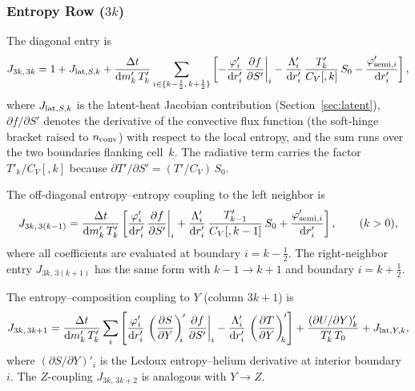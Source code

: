 \documentclass{aastex631}
\newcommand{\dd}{\mathrm{d}}
\newcommand{\pp}{\partial}
\newcommand{\Cv}{C_V}
\begin{document}
\subsubsection{Entropy Row ($3k$)}\label{sec:jac_entropy}

The diagonal entry is
\begin{equation}\label{eq:J_SS_diag}
  J_{3k,\,3k}
  = 1 + J_{{\rm lat},S,k}
  + \frac{\Delta t}{\dd m'_k\,T'_k}
    \sum_{i\in\{k-\frac{1}{2},\,k+\frac{1}{2}\}}
    \left[
      -\frac{\varphi'_i}{\dd r'_i}\,
       \frac{\pp f}{\pp S'}\bigg|_i
      -\frac{\Lambda'_i}{\dd r'_i}\,
       \frac{T'_k}{\Cv[,k]}\,S_0
      -\frac{\varphi'_{{\rm semi},i}}{\dd r'_i}
    \right],
\end{equation}
where $J_{{\rm lat},S,k}$ is the latent-heat Jacobian contribution
(Section~\ref{sec:latent}), $\pp f/\pp S'$ denotes the derivative
of the convective flux function (the soft-hinge bracket raised to
$n_{\rm conv}$) with respect to the local entropy, and the sum runs
over the two boundaries flanking cell~$k$.  The radiative term
carries the factor $T'_k/\Cv[,k]$ because $\pp T'/\pp S' = (T'/\Cv)\,S_0$.

The off-diagonal entropy--entropy coupling to the left neighbor is
\begin{equation}\label{eq:J_SS_km1}
  J_{3k,\,3(k-1)}
  = \frac{\Delta t}{\dd m'_k\,T'_k}
    \left[
      \frac{\varphi'_i}{\dd r'_i}\,
       \frac{\pp f}{\pp S'}\bigg|_i
    + \frac{\Lambda'_i}{\dd r'_i}\,
       \frac{T'_{k-1}}{\Cv[,k-1]}\,S_0
    + \frac{\varphi'_{{\rm semi},i}}{\dd r'_i}
    \right],
  \qquad (k>0),
\end{equation}
where all coefficients are evaluated at boundary $i=k-\tfrac{1}{2}$.
The right-neighbor entry $J_{3k,\,3(k+1)}$ has the same form with
$k-1\to k+1$ and boundary $i=k+\tfrac{1}{2}$.

The entropy--composition coupling to $Y$ (column $3k+1$) is
\begin{equation}\label{eq:J_SY}
  J_{3k,\,3k+1}
  = \frac{\Delta t}{\dd m'_k\,T'_k}
    \sum_i\left[
      \frac{\varphi'_i}{\dd r'_i}\,
       \left(\frac{\pp S}{\pp Y}\right)'_{\!\!i}
       \frac{\pp f}{\pp S'}\bigg|_i
    - \frac{\Lambda'_i}{\dd r'_i}\,
       \left(\frac{\pp T}{\pp Y}\right)'_{\!\!k}
    \right]
  + \frac{(\pp U/\pp Y)'_k}{T'_k\,T_0}
  + J_{{\rm lat},Y,k},
\end{equation}
where $(\pp S/\pp Y)'_i$ is the Ledoux entropy--helium derivative
at interior boundary~$i$.
The $Z$-coupling $J_{3k,\,3k+2}$ is analogous with $Y\to Z$.
\end{document}
